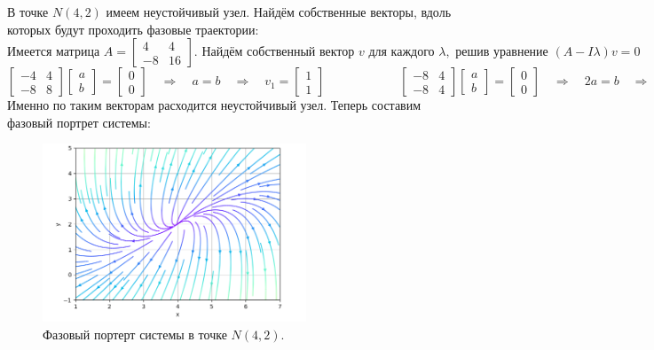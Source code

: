 \documentclass[a4paper]{article}
\begin{document}
В точке $N(4, 2)$ имеем неустойчивый узел. Найдём собственные векторы, вдоль которых будут проходить фазовые траектории:
$$\text{Имеется матрица } A = \begin{bmatrix}
        4  & 4  \\
        -8 & 16
    \end{bmatrix}. \text{ Найдём собственный вектор } v \text{ для каждого } \lambda, \text{ решив уравнение } (A-I\lambda)v = 0$$
$$\begin{bmatrix}
        -4 & 4 \\
        -8 & 8
    \end{bmatrix}\begin{bmatrix}
        a \\ b
    \end{bmatrix} = \begin{bmatrix}
        0 \\ 0
    \end{bmatrix} \quad\Rightarrow\quad a = b \quad\Rightarrow\quad v_1 = \begin{bmatrix}
        1 \\ 1
    \end{bmatrix}\qquad\qquad\qquad\begin{bmatrix}
        -8 & 4 \\
        -8 & 4
    \end{bmatrix}\begin{bmatrix}
        a \\ b
    \end{bmatrix} = \begin{bmatrix}
        0 \\ 0
    \end{bmatrix} \quad\Rightarrow\quad 2a = b \quad\Rightarrow\quad v_2 = \begin{bmatrix}
        2 \\ 1
    \end{bmatrix}$$
Именно по таким векторам расходится неустойчивый узел. Теперь составим фазовый портрет системы:
\begin{figure}[H]
    \centering \includegraphics[width=0.7\textwidth]{df_2.png}
    \caption{Фазовый портерт системы в точке $N(4, 2)$.}
\end{figure}
\end{document}
